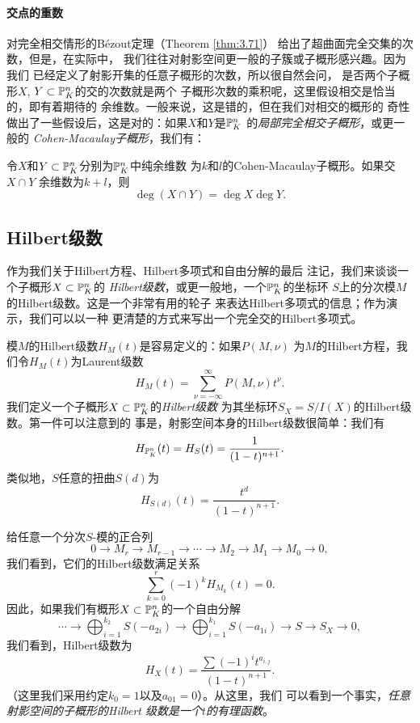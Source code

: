 \paragraph*{交点的重数}
对完全相交情形的B\'ezout定理（Theorem \ref{thm:3.71}）
给出了超曲面完全交集的次数，但是，在实际中，
我们往往对射影空间更一般的子簇或子概形感兴趣。因为我们
已经定义了射影开集的任意子概形的次数，所以很自然会问，
是否两个子概形$X$, $Y\subset \P_K^n$的交的次数就是两个
子概形次数的乘积呢，这里假设相交是恰当的，即有着期待的
余维数。一般来说，这是错的，但在我们对相交的概形的
奇性做出了一些假设后，这是对的：如果$X$和$Y$是$\P_K^n$
的\textit{局部完全相交子概形}，或更一般的
\textit{Cohen-Macaulay子概形}，我们有：

\begin{thm}
\label{thm:3.78}
令$X$和$Y\subset \P_K^n$分别为$\P_K^n$中纯余维数
为$k$和$l$的Cohen-Macaulay子概形。如果交$X\cap Y$
余维数为$k+l$，则
\[
	\deg(X\cap Y)=\deg X\deg Y.
\]
\end{thm}


\subsection{Hilbert级数}\label{s:3.3.6}

作为我们关于Hilbert方程、Hilbert多项式和自由分解的最后
注记，我们来谈谈一个子概形$X\subset \P_K^n$的
\textit{Hilbert级数}，或更一般地，一个$\P_K^n$的坐标环
$S$上的分次模$M$的Hilbert级数。这是一个非常有用的轮子
来表达Hilbert多项式的信息；作为演示，我们可以以一种
更清楚的方式来写出一个完全交的Hilbert多项式。

模$M$的Hilbert级数$H_M(t)$是容易定义的：如果$P(M,\nu)$
为$M$的Hilbert方程，我们令$H_M(t)$为Laurent级数
\[
	H_M(t)=\sum_{\nu=-\infty}^\infty P(M,\nu)t^\nu.
\]
我们定义一个子概形$X\subset \P_K^n$的\textit{Hilbert级数}
为其坐标环$S_X=S/I(X)$的Hilbert级数。第一件可以注意到的
事是，射影空间本身的Hilbert级数很简单：我们有
\[
	H_{\P^n_K}(t)=H_S(t)=\frac{1}{(1-t)^{n+1}}.
\]
类似地，$S$任意的扭曲$S(d)$为
\[
	H_{S(d)}(t)=\frac{t^d}{(1-t)^{n+1}}.
\]

给任意一个分次$S$-模的正合列
\[
	0\longrightarrow M_r\longrightarrow M_{r-1}
	\longrightarrow \cdots \longrightarrow M_2
	\longrightarrow M_1 \longrightarrow M_0
	\longrightarrow 0,
\]
我们看到，它们的Hilbert级数满足关系
\[
	\sum_{k=0}^r(-1)^k H_{M_k}(t)=0.
\]
因此，如果我们有概形$X\subset \P_K^n$的一个自由分解
\[
	\cdots \longrightarrow \bigoplus_{i=1}^{k_2}
	S(-a_{2i})\longrightarrow \bigoplus_{i=1}^{k_1}
	S(-a_{1i})\longrightarrow S\longrightarrow S_X
	\longrightarrow 0,
\]
我们看到，Hilbert级数为
\[
	H_X(t)=\frac{\sum (-1)^i t^{a_{i,j}}}{(1-t)^{n+1}}.
\]%
（这里我们采用约定$k_0=1$以及$a_{01}=0$）。从这里，我们
可以看到一个事实，\textit{任意射影空间的子概形的Hilbert
级数是一个$t$的有理函数}。

